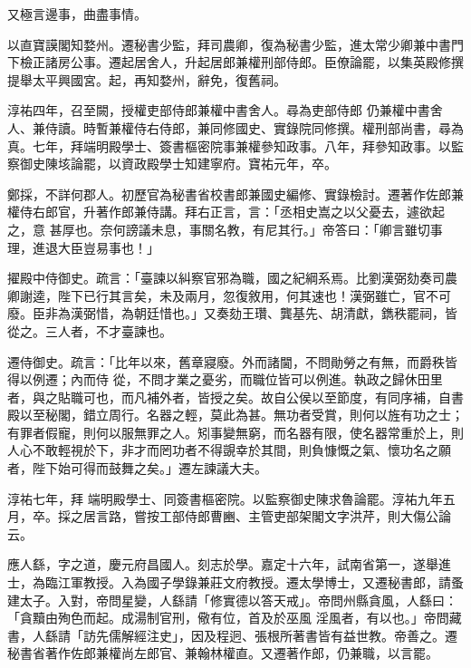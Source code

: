 \begin{pinyinscope}
 又極言邊事，曲盡事情。



 以直寶謨閣知婺州。遷秘書少監，拜司農卿，復為秘書少監，進太常少卿兼中書門下檢正諸房公事。遷起居舍人，升起居郎兼權刑部侍郎。臣僚論罷，以集英殿修撰提舉太平興國宮。起，再知婺州，辭免，復舊祠。



 淳祐四年，召至闕，授權吏部侍郎兼權中書舍人。尋為吏部侍郎
 仍兼權中書舍人、兼侍讀。時暫兼權侍右侍郎，兼同修國史、實錄院同修撰。權刑部尚書，尋為真。七年，拜端明殿學士、簽書樞密院事兼權參知政事。八年，拜參知政事。以監察御史陳垓論罷，以資政殿學士知建寧府。寶祐元年，卒。



 鄭採，不詳何郡人。初歷官為秘書省校書郎兼國史編修、實錄檢討。遷著作佐郎兼權侍右郎官，升著作郎兼侍講。拜右正言，言：「丞相史嵩之以父憂去，遽欲起之，意
 甚厚也。奈何謗議未息，事關名教，有尼其行。」帝答曰：「卿言雖切事理，進退大臣豈易事也！」



 擢殿中侍御史。疏言：「臺諫以糾察官邪為職，國之紀綱系焉。比劉漢弼劾奏司農卿謝逵，陛下已行其言矣，未及兩月，忽復敘用，何其速也！漢弼雖亡，官不可廢。臣非為漢弼惜，為朝廷惜也。」又奏劾王瓚、龔基先、胡清獻，鐫秩罷祠，皆從之。三人者，不才臺諫也。



 遷侍御史。疏言：「比年以來，舊章寢廢。外而諸閫，不問勛勞之有無，而爵秩皆得以例遷；內而侍
 從，不問才業之憂劣，而職位皆可以例進。執政之歸休田里者，與之貼職可也，而凡補外者，皆授之矣。故自公侯以至節度，有同序補，自書殿以至秘閣，錯立周行。名器之輕，莫此為甚。無功者受賞，則何以旌有功之士；有罪者假寵，則何以服無罪之人。矧事變無窮，而名器有限，使名器常重於上，則人心不敢輕視於下，非才而罔功者不得覬幸於其間，則負慷慨之氣、懷功名之願者，陛下始可得而鼓舞之矣。」遷左諫議大夫。



 淳祐七年，拜
 端明殿學士、同簽書樞密院。以監察御史陳求魯論罷。淳祐九年五月，卒。採之居言路，嘗按工部侍郎曹豳、主管吏部架閣文字洪芹，則大傷公論云。



 應人繇，字之道，慶元府昌國人。刻志於學。嘉定十六年，試南省第一，遂舉進士，為臨江軍教授。入為國子學錄兼莊文府教授。遷太學博士，又遷秘書郎，請蚤建太子。入對，帝問星變，人繇請「修實德以答天戒」。帝問州縣貪風，人繇曰：「貪黷由殉色而起。成湯制官刑，儆有位，首及於巫風
 淫風者，有以也。」帝問藏書，人繇請「訪先儒解經注史」，因及程迥、張根所著書皆有益世教。帝善之。遷秘書省著作佐郎兼權尚左郎官、兼翰林權直。又遷著作郎，仍兼職，以言罷。




\end{pinyinscope}
